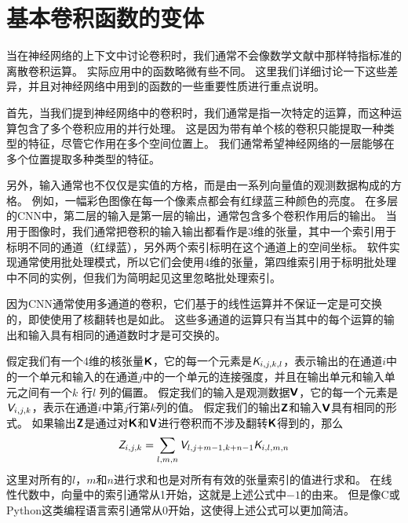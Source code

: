 
\section{基本卷积函数的变体}
\label{sec:variants_of_the_basic_convolution_function}

当在神经网络的上下文中讨论卷积时，我们通常不会像数学文献中那样特指标准的离散卷积运算。
实际应用中的函数略微有些不同。
这里我们详细讨论一下这些差异，并且对神经网络中用到的函数的一些重要性质进行重点说明。

首先，当我们提到神经网络中的卷积时，我们通常是指一次特定的运算，而这种运算包含了多个卷积应用的并行处理。
这是因为带有单个核的卷积只能提取一种类型的特征，尽管它作用在多个空间位置上。
我们通常希望神经网络的一层能够在多个位置提取多种类型的特征。

另外，输入通常也不仅仅是实值的方格，而是由一系列向量值的观测数据构成的方格。
例如，一幅彩色图像在每一个像素点都会有红绿蓝三种颜色的亮度。
在多层的\gls{CNN}中，第二层的输入是第一层的输出，通常包含多个卷积作用后的输出。
当用于图像时，我们通常把卷积的输入输出都看作是3维的张量，其中一个索引用于标明不同的通道（红绿蓝），另外两个索引标明在这个通道上的空间坐标。
软件实现通常使用批处理模式，所以它们会使用4维的张量，第四维索引用于标明批处理中不同的实例，但我们为简明起见这里忽略批处理索引。

因为\gls{CNN}通常使用多通道的卷积，它们基于的线性运算并不保证一定是可交换的，即使使用了核翻转也是如此。
这些多通道的运算只有当其中的每个运算的输出和输入具有相同的通道数时才是可交换的。

假定我们有一个4维的核张量$\textsf{\textbf{K}}$，它的每一个元素是$\textit{\textsf{K}}_{i,j,k,l}$，表示输出的在通道$i$中的一个单元和输入的在通道$j$中的一个单元的连接强度，并且在输出单元和输入单元之间有一个$k$ 行$l$ 列的偏置。
假定我们的输入是观测数据$\textsf{\textbf{V}}$，它的每一个元素是$\textit{\textsf{V}}_{i,j,k}$，表示在通道$i$中第$j$行第$k$列的值。
假定我们的输出$\textsf{\textbf{Z}}$和输入$\textsf{\textbf{V}}$具有相同的形式。
如果输出$\textsf{\textbf{Z}}$是通过对$\textsf{\textbf{K}}$和$\textsf{\textbf{V}}$进行卷积而不涉及翻转$\textsf{\textbf{K}}$得到的，那么
\begin{equation}
\textit{\textsf{Z}}_{i,j,k} = \sum_{l,m,n} \textit{\textsf{V}}_{l, j+m-1, k+n-1} \textit{\textsf{K}}_{i,l,m,n}
\end{equation}
这里对所有的$l$，$m$和$n$进行求和也是对所有有效的张量索引的值进行求和。
在线性代数中，向量中的索引通常从1开始，这就是上述公式中$-1$的由来。
但是像C或Python这类编程语言索引通常从0开始，这使得上述公式可以更加简洁。

 

